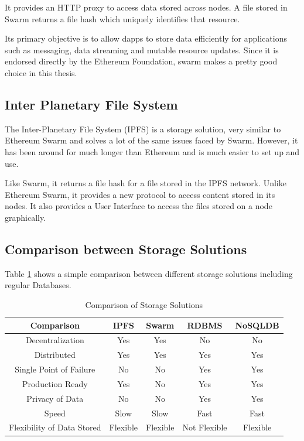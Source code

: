 \documentclass[11pt,openright]{report}
\begin{document}
It provides an HTTP proxy to access data stored across nodes. A file stored in Swarm returns a file hash which uniquely identifies that resource.

Its primary objective is to allow dapps to store data efficiently for applications such as messaging, data streaming and mutable resource updates. Since it is endorsed directly by the Ethereum Foundation, swarm makes a pretty good choice in this thesis.


\subsection{Inter Planetary File System}
The Inter-Planetary File System (IPFS) \cite{ipfs2014} is a storage solution, very similar to Ethereum Swarm and solves a lot of the same issues faced by Swarm. However, it has been around for much longer than Ethereum and is much easier to set up and use.

Like Swarm, it returns a file hash for a file stored in the IPFS network. Unlike Ethereum Swarm, it provides a new protocol to access content stored in its nodes. It also provides a User Interface to access the files stored on a node graphically.

\newpage
\subsection{Comparison between Storage Solutions}
Table \ref{swarm_eth_comparison} shows a simple comparison between different storage solutions including regular Databases.

\begin{table}[!htbp]
	\renewcommand{\arraystretch}{1.3}
	\caption{Comparison of Storage Solutions}
	\label{swarm_eth_comparison}
	\centering
	\begin{tabular}{|c||c|c|c|c|}
		\hline
		\bfseries Comparison & \bfseries IPFS & \bfseries Swarm & \bfseries RDBMS & \bfseries NoSQLDB \\
		\hline\hline
		Decentralization & Yes & Yes & No & No \\ \hline
		Distributed  & Yes & Yes & Yes & Yes \\ \hline
		Single Point of Failure & No & No & Yes & Yes \\ \hline
		Production Ready & Yes & No & Yes & Yes \\ \hline
		Privacy of Data & No & No & Yes & Yes\\ \hline
		Speed & Slow & Slow & Fast & Fast\\ \hline
		Flexibility of Data Stored & Flexible & Flexible & Not Flexible & Flexible \\ \hline
	\end{tabular}
\end{table}
\end{document}
